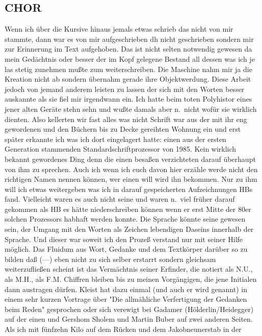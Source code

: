 \documentclass[
]{article}
\author{}
\date{\vspace{-2.5em}}
\begin{document}
\subsection{CHOR}\label{chor}

Wenn ich über die Kursive hinaus jemals etwas schrieb das nicht von mir
stammte, dann war es von mir aufgeschrieben dh nicht geschrieben sondern
mir zur Erinnerung im Text aufgehoben. Das ist nicht selten notwendig
gewesen da mein Gedächtnis oder besser der im Kopf gelegene Bestand all
dessen was ich je las stetig zunehmen mußte zum weiterschreiben. Die
Maschine nahm mir ja die Kreation nicht ab sondern übernahm gerade ihre
Objektwerdung. Diese Arbeit jedoch von jemand anderem leisten zu lassen
der sich mit den Worten besser auskannte als sie fiel mir irgendwann
ein. Ich hatte beim toten Polyhistor eines jener alten Geräte stehn sehn
und wußte damals aber n.~nicht wofür sie wirklich dienten. Also
kellerten wir fast alles was nicht Schrift war aus der mit ihr eng
gewordenen und den Büchern bis zu Decke gereihten Wohnung ein und erst
später erkannte ich was ich dort eingelagert hatte: einen aus der ersten
Generation stammenden Standardschriftprozessor von 1985. Kein wirklich
bekannt gewordenes Ding denn die einen besaßen verzichteten darauf
überhaupt von ihm zu sprechen. Auch ich wenn ich euch davon hier erzähle
werde nicht den richtigen Namen nennen können, wer einen will wird ihn
bekommen. Nur zu ihm will ich etwas weitergeben was ich in darauf
gespeicherten Aufzeichnungen HBs fand. Vielleicht waren es auch nicht
seine und waren n.~viel früher darauf gekommen als HB es hätte
niederschreiben können wenn er erst Mitte der 80er solchen Prozessors
habhaft werden konnte. Die Sprache könnte seine gewesen sein, der Umgang
mit den Worten als Zeichen lebendigen Daseins innerhalb der Sprache. Und
dieser war soweit ich den Prozeß verstand nur mit seiner Hilfe möglich.
Das Fluidum aus Wort, Gedanke und dem Textkörper darüber so zu bilden
daß (---) eben nicht zu sich selber erstarrt sondern gleichsam
weiterzufließen scheint ist das Vermächtnis seiner Erfinder, die notiert
als N.U., als M.H., als F.M. Chiffren bleiben bis zu meinen Vorgängigen,
die jene Initialen dann austragen dürfen. Kleist hat dazu einmal (und
auch er wird genannt) in einem sehr kurzen Vortrage über "Die
allmähliche Verfertigung der Gedanken beim Reden" gesprochen oder sich
verewigt bei Gadamer (Hölderlin/Heidegger) auf der einen und Gershom
Sholem und Martin Buber auf zwei anderen Seiten.\\
Als ich mit fünfzehn Kilo auf dem Rücken und dem Jakobneunerstab in der
\end{document}
